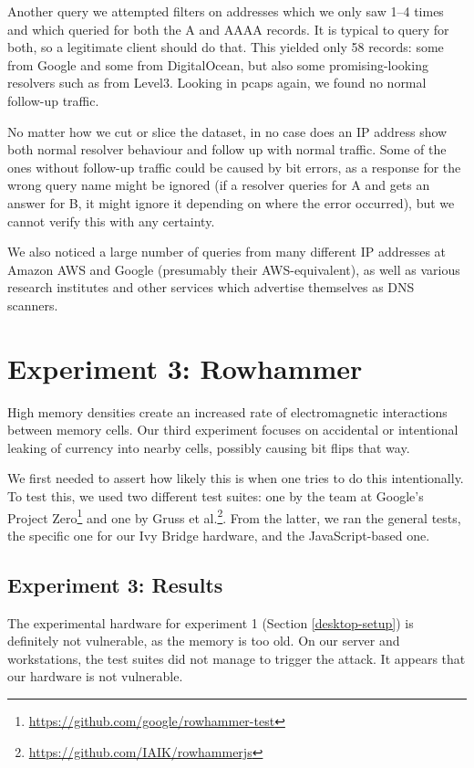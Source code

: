 \documentclass[conference]{IEEEtran}
\begin{document}
Another query we attempted filters on addresses which we only saw 1--4 times
and which queried for both the A and AAAA records. It is typical to query for
both, so a legitimate client should do that. This yielded only 58 records: some
from Google and some from DigitalOcean, but also some promising-looking
resolvers such as from Level3. Looking in pcaps again, we found no normal
follow-up traffic.

No matter how we cut or slice the dataset, in no case does an IP address show
both normal resolver behaviour and follow up with normal traffic. Some of the
ones without follow-up traffic could be caused by bit errors, as a response for
the wrong query name might be ignored (if a resolver queries for A and gets an
answer for B, it might ignore it depending on where the error occurred), but
we cannot verify this with any certainty.

We also noticed a large number of queries from many different IP addresses at
Amazon AWS and Google (presumably their AWS-equivalent), as well as various
research institutes and other services which advertise themselves as DNS
scanners.

\section{Experiment 3: Rowhammer}\label{sec:exp3}

High memory densities create an increased rate of electromagnetic interactions
between memory cells\cite{kim2014flipping}. Our third experiment focuses on
accidental or intentional leaking of currency into nearby cells, possibly
causing bit flips that way.

We first needed to assert how likely this is when one tries to do this
intentionally. To test this, we used two different test suites: one by the team
at Google's Project
Zero\footnote{\url{https://github.com/google/rowhammer-test}} and one by Gruss
et
al.\cite{gruss2016rowhammer}\footnote{\url{https://github.com/IAIK/rowhammerjs}}.
From the latter, we ran the general tests, the specific one for our Ivy Bridge
hardware, and the JavaScript-based one.


\subsection{Experiment 3: Results}\label{sub:exp3r}

The experimental hardware for experiment 1 (Section \ref{desktop-setup}) is
definitely not vulnerable, as the memory is too old. On our server and
workstations, the test suites did not manage to trigger the attack. It appears
that our hardware is not vulnerable.
\end{document}
